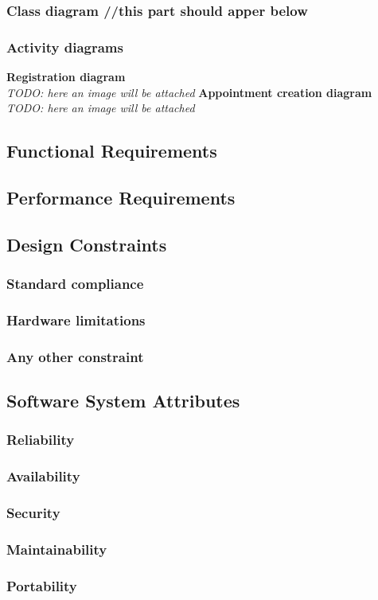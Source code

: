	\subsubsection{Class diagram //this part should apper below }
	\subsubsection{Activity diagrams}
		\textbf{Registration diagram} \\
		\indent \textit{TODO: here an image will be attached}
		\newline
		\textbf{Appointment creation diagram} \\
		\indent \textit{TODO: here an image will be attached}
\subsection{Functional Requirements}
\subsection{Performance Requirements}
\subsection{Design Constraints}
	\subsubsection{Standard compliance}
	\subsubsection{Hardware limitations}
	\subsubsection{Any other constraint}
\subsection{Software System Attributes} 
	\subsubsection{Reliability}
	\subsubsection{Availability}
	\subsubsection{Security}
	\subsubsection{Maintainability}
	\subsubsection{Portability}